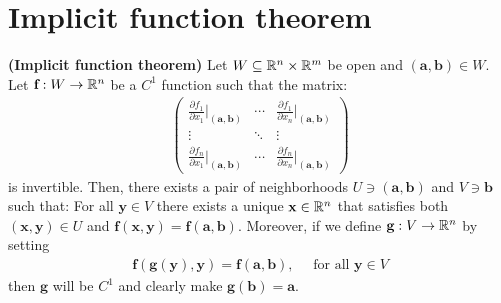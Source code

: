 \documentclass{report}
\begin{document}
\section{Implicit function theorem}
\begin{theorem}
\label{THipft}
\textbf{(Implicit function theorem)} Let $W \subseteq \mathbb{R}^n \times \mathbb{R}^m$ be open and $(\textbf{a},\textbf{b}) \in W$. Let $\textbf{f}:W\rightarrow \mathbb{R}^n$ be a $C^1$  function such that the matrix: 
\begin{align*}
\begin{pmatrix} 
  \frac{\partial f_1}{\partial x_1} \Big  |_{(\textbf{a},\textbf{b})} & \cdots & \frac{\partial f_1}{\partial x_n} \Big |_{(\textbf{a},\textbf{b})}  \\
  \vdots & \ddots & \vdots \\
  \frac{\partial f_n}{\partial x_1} \Big|_{(\textbf{a},\textbf{b})} & \cdots & \frac{\partial f_n}{\partial x_n} \Big  |_{(\textbf{a},\textbf{b})} 
\end{pmatrix}
\end{align*}
is invertible. Then, there exists a pair of neighborhoods $U \ni (\textbf{a},\textbf{b})$ and $V \ni \textbf{b}$ such that: For all  $\textbf{y} \in V$ there exists a unique $\textbf{x} \in\mathbb{R}^n$ that satisfies both  $(\textbf{x},\textbf{y})\in U$ and $\textbf{f}(\textbf{x},\textbf{y})=\textbf{f}(\textbf{a},\textbf{b})$. Moreover, if we define $\textbf{g}:V \rightarrow \mathbb{R}^n$ by setting 
\begin{align*}
\textbf{f}(\textbf{g}(\textbf{y}), \textbf{y}) = \textbf{f}(\textbf{a},\textbf{b}),\quad \text{ for all }\textbf{y} \in V
\end{align*}
then $\textbf{g}$ will be $C^1$ and clearly make $\textbf{g}(\textbf{b})=\textbf{a}$. 


\end{theorem}
\end{document}
